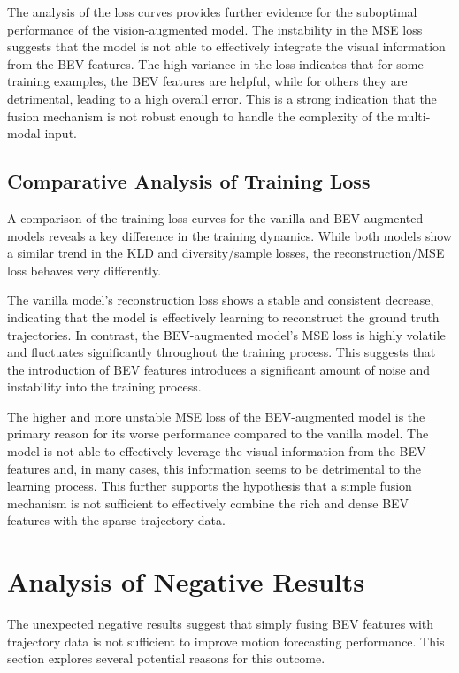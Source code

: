 The analysis of the loss curves provides further evidence for the suboptimal performance of the vision-augmented model. The instability in the MSE loss suggests that the model is not able to effectively integrate the visual information from the BEV features. The high variance in the loss indicates that for some training examples, the BEV features are helpful, while for others they are detrimental, leading to a high overall error. This is a strong indication that the fusion mechanism is not robust enough to handle the complexity of the multi-modal input.

\subsection{Comparative Analysis of Training Loss}

A comparison of the training loss curves for the vanilla and BEV-augmented models reveals a key difference in the training dynamics. While both models show a similar trend in the KLD and diversity/sample losses, the reconstruction/MSE loss behaves very differently.

The vanilla model's reconstruction loss shows a stable and consistent decrease, indicating that the model is effectively learning to reconstruct the ground truth trajectories. In contrast, the BEV-augmented model's MSE loss is highly volatile and fluctuates significantly throughout the training process. This suggests that the introduction of BEV features introduces a significant amount of noise and instability into the training process.

The higher and more unstable MSE loss of the BEV-augmented model is the primary reason for its worse performance compared to the vanilla model. The model is not able to effectively leverage the visual information from the BEV features and, in many cases, this information seems to be detrimental to the learning process. This further supports the hypothesis that a simple fusion mechanism is not sufficient to effectively combine the rich and dense BEV features with the sparse trajectory data.

\section{Analysis of Negative Results}

The unexpected negative results suggest that simply fusing BEV features with trajectory data is not sufficient to improve motion forecasting performance. This section explores several potential reasons for this outcome.

